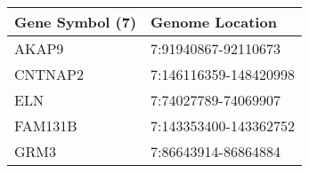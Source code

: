 \begin{tabular}{ll}
\toprule
Gene Symbol (7) &       Genome Location \\
\midrule
          AKAP9 &   7:91940867-92110673 \\
        CNTNAP2 & 7:146116359-148420998 \\
            ELN &   7:74027789-74069907 \\
        FAM131B & 7:143353400-143362752 \\
           GRM3 &   7:86643914-86864884 \\
\bottomrule
\end{tabular}
